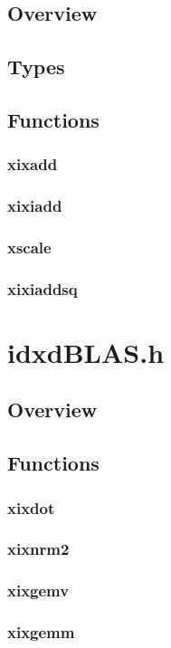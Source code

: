\documentclass[12pt]{article}
\theoremstyle{plain}
\begin{document}
  \subsection{Overview}
  \subsection{Types}
  \subsection{Functions}
    \subsubsection{xixadd}
    \subsubsection{xixiadd}
    \subsubsection{xscale}
    \subsubsection{xixiaddsq}
\section{idxdBLAS.h}
  \subsection{Overview}
  \subsection{Functions}
    \subsubsection{xixdot}
    \subsubsection{xixnrm2}
    \subsubsection{xixgemv}
    \subsubsection{xixgemm}
\end{document}
